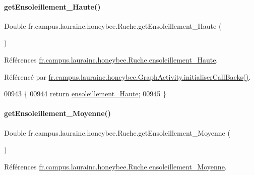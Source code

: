 \paragraph{\texorpdfstring{get\+Ensoleillement\+\_\+\+Haute()}{getEnsoleillement\_Haute()}}
{\footnotesize\ttfamily Double fr.\+campus.\+laurainc.\+honeybee.\+Ruche.\+get\+Ensoleillement\+\_\+\+Haute (\begin{DoxyParamCaption}{ }\end{DoxyParamCaption})}



Références \hyperlink{classfr_1_1campus_1_1laurainc_1_1honeybee_1_1_ruche_a3b55f2c08cef225db52991e4023201c7}{fr.\+campus.\+laurainc.\+honeybee.\+Ruche.\+ensoleillement\+\_\+\+Haute}.



Référencé par \hyperlink{classfr_1_1campus_1_1laurainc_1_1honeybee_1_1_graph_activity_a8dc56c3e0744bcb9295ad10e726b5fdb}{fr.\+campus.\+laurainc.\+honeybee.\+Graph\+Activity.\+initialiser\+Call\+Backs()}.


\begin{DoxyCode}
00943                                             \{
00944         \textcolor{keywordflow}{return} \hyperlink{classfr_1_1campus_1_1laurainc_1_1honeybee_1_1_ruche_a3b55f2c08cef225db52991e4023201c7}{ensoleillement\_Haute};
00945     \}
\end{DoxyCode}
\mbox{\label{classfr_1_1campus_1_1laurainc_1_1honeybee_1_1_ruche_ab516b3c8cee816884e2f23c863078837}} 
\paragraph{\texorpdfstring{get\+Ensoleillement\+\_\+\+Moyenne()}{getEnsoleillement\_Moyenne()}}
{\footnotesize\ttfamily Double fr.\+campus.\+laurainc.\+honeybee.\+Ruche.\+get\+Ensoleillement\+\_\+\+Moyenne (\begin{DoxyParamCaption}{ }\end{DoxyParamCaption})}



Références \hyperlink{classfr_1_1campus_1_1laurainc_1_1honeybee_1_1_ruche_af3da6a0f98d377ec6633f40a8c0e5c99}{fr.\+campus.\+laurainc.\+honeybee.\+Ruche.\+ensoleillement\+\_\+\+Moyenne}.



